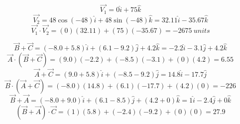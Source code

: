 \documentclass[11pt]{homework}
\begin{document}
\setcounter{questionCounter}{21}
\question
\[
    \vec{V_1} = 0 \hat{i} + 75 \hat{k}
\]
\[
    \vec{V_2} = 48\cos(-48) \hat{i} + 48\sin(-48) \hat{k} = 32.11 \hat{i} - 35.67 \hat{k}
\]
\[
    \vec{V_1} \cdot \vec{V_2} =  (0)(32.11) + (75)(-35.67) = \boxed{\qty{-2675}{units}}
\]

\setcounter{questionCounter}{24}
\question
\begin{alphaparts}
\questionpart
\[
    \vec{B} + \vec{C} = (-8.0 + 5.8)\hat{i} + (6.1-9.2)\hat{j} + 4.2 \hat{k} = -2.2 \hat{i} -3.1 \hat{j} +4.2 \hat{k}
\]
\[
    \vec{A} \cdot (\vec{B}+\vec{C}) = (9.0)(-2.2) + (-8.5)(-3.1) + (0)(4.2) = \boxed{6.55}
\]
\questionpart
\[
    \vec{A}+\vec{C} = (9.0+5.8)\hat{i} + (-8.5-9.2)\hat{j} = 14.8\hat{i} - 17.7 \hat{j}   
\]\[
\vec{B} \cdot (\vec{A}+\vec{C}) = (-8.0)(14.8) + (6.1)(-17.7) + (4.2)(0) = \boxed{-226}
\]
\questionpart
\[
    \vec{B}+\vec{A} = (-8.0+9.0)\hat{i} + (6.1-8.5)\hat{j} + (4.2+0)\hat{k} = 1\hat{i} - 2.4 \hat{j} + 0\hat{k}
\]
\[
    (\vec{B}+\vec{A}) \cdot \vec{C} = (1)(5.8) + (-2.4)(-9.2) + (0)(0) = \boxed{27.9}
\]


\end{alphaparts}

\setcounter{questionCounter}{36}
\question

\end{document}
